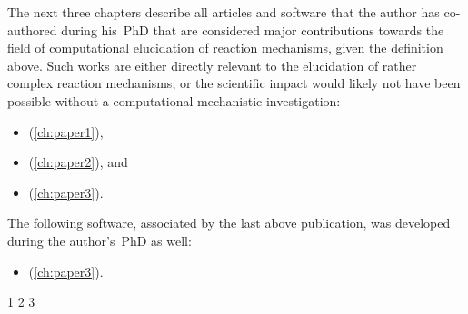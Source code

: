 The next three chapters describe all articles and software that the author has co-authored
during his~PhD that are considered major contributions towards the field of
computational elucidation of reaction mechanisms, given the definition above.
Such works are either directly relevant to the elucidation of rather complex reaction
mechanisms, or the scientific impact would likely not have been possible without a
computational mechanistic investigation:
%
\begin{itemize}
	\item {} (\cref{ch:paper1}),
	\item {} (\cref{ch:paper2}), and
	\item {} (\cref{ch:paper3}).
\end{itemize}
%
The following software, associated by the last above publication, was developed during the
author's~PhD as well:
%
\begin{itemize}
	\item {} (\cref{ch:paper3}).
\end{itemize}

{1}
{2}
{3}
